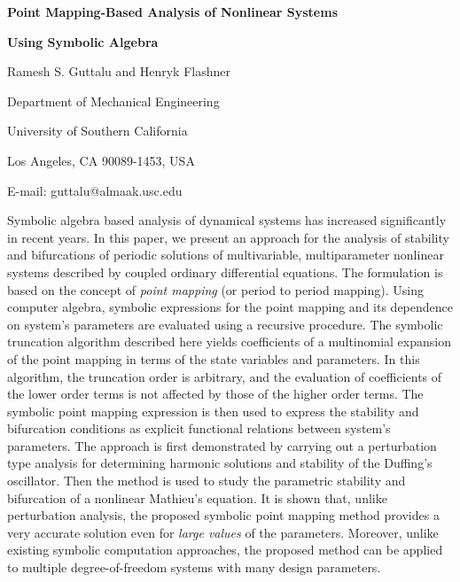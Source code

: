 

\centerline{\bf Point Mapping-Based Analysis of Nonlinear Systems}
\centerline{\bf Using Symbolic Algebra}

\vskip 0.3cm

\centerline{Ramesh S. Guttalu and Henryk Flashner}
\centerline{Department of Mechanical Engineering}
\centerline{University of Southern California}
\centerline{Los Angeles, CA 90089-1453, USA}
\centerline{E-mail: guttalu@almaak.usc.edu}

\vskip 0.3cm

Symbolic algebra based analysis of dynamical systems has increased
significantly in recent years. In this paper, we present an approach for the
analysis of stability and bifurcations of periodic solutions of
multivariable, multiparameter nonlinear systems described by coupled
ordinary differential equations. The formulation is based on the concept of
{\em point mapping} (or period to period mapping). Using computer algebra,
symbolic expressions for the point mapping and its dependence on system's
parameters are evaluated using a recursive procedure. The symbolic
truncation algorithm described here yields coefficients of a multinomial
expansion of the point mapping in terms of the state variables and
parameters. In this algorithm, the truncation order is arbitrary, and the
evaluation of coefficients of the lower order terms is not affected by those
of the higher order terms. The symbolic point mapping expression is then
used to express the stability and bifurcation conditions as explicit
functional relations between system's parameters.  The approach is first
demonstrated by carrying out a perturbation type analysis for determining
harmonic solutions and stability of the Duffing's oscillator. Then the
method is used to study the parametric stability and bifurcation of a
nonlinear Mathieu's equation.  It is shown that, unlike perturbation
analysis, the proposed symbolic point mapping method provides a very
accurate solution even for {\em large values} of the parameters.  Moreover,
unlike existing symbolic computation approaches, the proposed method can
be applied to multiple degree-of-freedom systems with many design
parameters.



